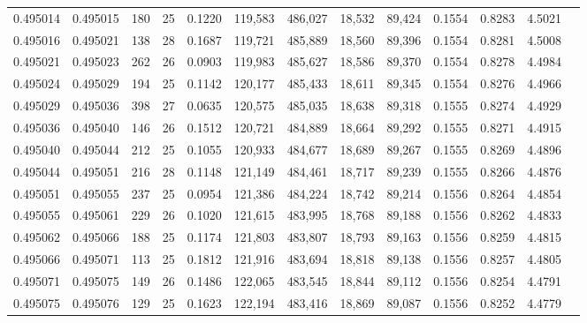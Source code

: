 \begin{tabular}{rrrrrrrrrrrrr}
0.495014 & 0.495015 & 180 &  25 &                                     0.1220 & 119,583 & 486,027 &  18,532 &  89,424 & 0.1554 & 0.8283 & 4.5021 \\
0.495016 & 0.495021 & 138 &  28 &                                     0.1687 & 119,721 & 485,889 &  18,560 &  89,396 & 0.1554 & 0.8281 & 4.5008 \\
0.495021 & 0.495023 & 262 &  26 &                                     0.0903 & 119,983 & 485,627 &  18,586 &  89,370 & 0.1554 & 0.8278 & 4.4984 \\
0.495024 & 0.495029 & 194 &  25 &                                     0.1142 & 120,177 & 485,433 &  18,611 &  89,345 & 0.1554 & 0.8276 & 4.4966 \\
0.495029 & 0.495036 & 398 &  27 &                                     0.0635 & 120,575 & 485,035 &  18,638 &  89,318 & 0.1555 & 0.8274 & 4.4929 \\
0.495036 & 0.495040 & 146 &  26 &                                     0.1512 & 120,721 & 484,889 &  18,664 &  89,292 & 0.1555 & 0.8271 & 4.4915 \\
0.495040 & 0.495044 & 212 &  25 &                                     0.1055 & 120,933 & 484,677 &  18,689 &  89,267 & 0.1555 & 0.8269 & 4.4896 \\
0.495044 & 0.495051 & 216 &  28 &                                     0.1148 & 121,149 & 484,461 &  18,717 &  89,239 & 0.1555 & 0.8266 & 4.4876 \\
0.495051 & 0.495055 & 237 &  25 &                                     0.0954 & 121,386 & 484,224 &  18,742 &  89,214 & 0.1556 & 0.8264 & 4.4854 \\
0.495055 & 0.495061 & 229 &  26 &                                     0.1020 & 121,615 & 483,995 &  18,768 &  89,188 & 0.1556 & 0.8262 & 4.4833 \\
0.495062 & 0.495066 & 188 &  25 &                                     0.1174 & 121,803 & 483,807 &  18,793 &  89,163 & 0.1556 & 0.8259 & 4.4815 \\
0.495066 & 0.495071 & 113 &  25 &                                     0.1812 & 121,916 & 483,694 &  18,818 &  89,138 & 0.1556 & 0.8257 & 4.4805 \\
0.495071 & 0.495075 & 149 &  26 &                                     0.1486 & 122,065 & 483,545 &  18,844 &  89,112 & 0.1556 & 0.8254 & 4.4791 \\
0.495075 & 0.495076 & 129 &  25 &                                     0.1623 & 122,194 & 483,416 &  18,869 &  89,087 & 0.1556 & 0.8252 & 4.4779 \\

\end{tabular}
